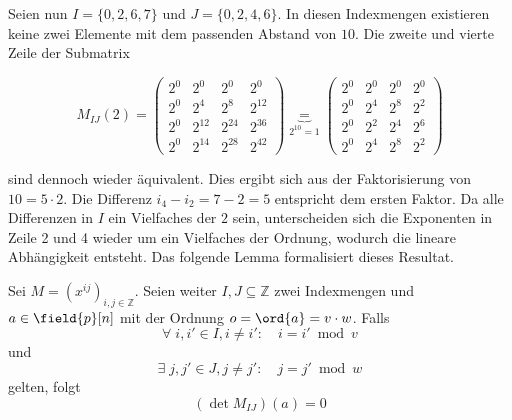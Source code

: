 Seien nun $I=\{0,2,6,7\}$ und $J=\{0,2,4,6\}$. In diesen Indexmengen existieren keine zwei Elemente mit dem passenden Abstand von $10$. Die zweite und vierte Zeile der Submatrix

\begin{equation*}
    M_{IJ}(2) = \begin{pmatrix}
        2^{0} & 2^{0} & 2^{0} & 2^{0} \\
        2^{0} & 2^{4} & 2^{8} & 2^{12} \\
        2^{0} & 2^{12} & 2^{24} & 2^{36} \\
        2^{0} & 2^{14} & 2^{28} & 2^{42} 
    \end{pmatrix} \underbrace{=}_{2^{10}=1} \begin{pmatrix}
        2^{0} & 2^{0} & 2^{0} & 2^{0} \\
        2^{0} & 2^{4} & 2^{8} & 2^{2} \\
        2^{0} & 2^{2} & 2^{4} & 2^{6} \\
        2^{0} & 2^{4} & 2^{8} & 2^{2} 
    \end{pmatrix}
\end{equation*}

sind dennoch wieder äquivalent. Dies ergibt sich aus der Faktorisierung von $10 = 5 \cdot 2$. Die Differenz $i_4 - i_2 = 7 - 2 = 5$ entspricht dem ersten Faktor. Da alle Differenzen in $I$ ein Vielfaches der $2$ sein, unterscheiden sich die Exponenten in Zeile 2 und 4 wieder um ein Vielfaches der Ordnung, wodurch die lineare Abhängigkeit entsteht. Das folgende Lemma formalisiert dieses Resultat.

\begin{lemma} \label{lemma:equal-columns}
    Sei $M = \left( x^{ij} \right)_{i,j \in \mathbb{Z}}$. Seien weiter $I,J \subseteq \mathbb{Z}$ zwei Indexmengen und $a \in \field{p}[n]$ mit der Ordnung $o = \ord{a} = v\cdot w$. Falls
    \begin{equation} \label{equation:all-equal}
        \forall \; i, i' \in I, i \neq i':\quad i = i' \bmod v
    \end{equation}
    und
    \begin{equation} \label{equation:two-equal}
        \exists \; j, j' \in J, j \neq j':\quad  j = j' \bmod w
    \end{equation}
    gelten, folgt
    \begin{equation*}
        (\det M_{IJ})(a) = 0
    \end{equation*}
\end{lemma}

